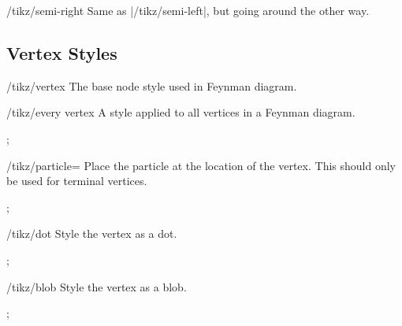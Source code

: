 \documentclass[a4paper,final]{ltxdoc}
\begin{document}
\begin{key}{/tikz/semi-right}
  Same as |/tikz/semi-left|, but going around the other way.
\end{key}


\subsection{Vertex Styles}
\label{subsec:vertex_styles}

\begin{key}{/tikz/vertex}
  The base node style used in Feynman diagram.
\end{key}

\begin{key}{/tikz/every vertex}
  A style applied to all vertices in a Feynman diagram.

\begin{codeexample}[]
\tikz {};
\end{codeexample}
\end{key}

\begin{key}{/tikz/particle=}
  Place the particle  at the location of the vertex.  This should
  only be used for terminal vertices.

\begin{codeexample}[]
\tikz {};
\end{codeexample}
\end{key}

\begin{key}{/tikz/dot}
  Style the vertex as a dot.

\begin{codeexample}[]
\tikz {};
\end{codeexample}
\end{key}

\begin{key}{/tikz/blob}
  Style the vertex as a blob.

\begin{codeexample}[]
\tikz {};
\end{codeexample}
\end{key}

\printindex
\end{document}
